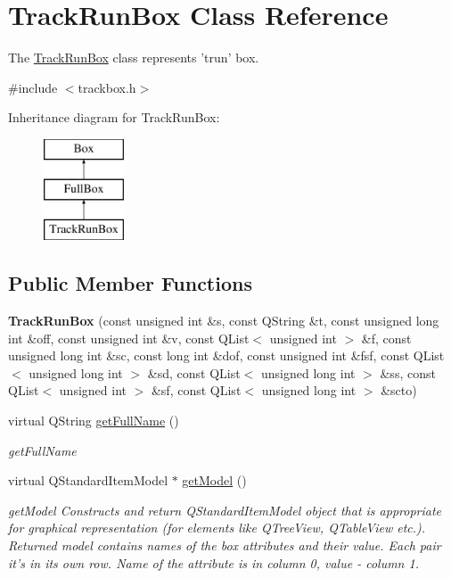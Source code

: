 \hypertarget{class_track_run_box}{\section{Track\-Run\-Box Class Reference}
\label{class_track_run_box}
}


The \hyperlink{class_track_run_box}{Track\-Run\-Box} class represents 'trun' box.  




{\ttfamily \#include $<$trackbox.\-h$>$}

Inheritance diagram for Track\-Run\-Box\-:\begin{figure}[H]
\begin{center}
\leavevmode
\includegraphics[height=3.000000cm]{class_track_run_box}
\end{center}
\end{figure}
\subsection*{Public Member Functions}
\begin{DoxyCompactItemize}
\item 
\hypertarget{class_track_run_box_a8d6ff78f87ff74803614479a5c414869}{{\bfseries Track\-Run\-Box} (const unsigned int \&s, const Q\-String \&t, const unsigned long int \&off, const unsigned int \&v, const Q\-List$<$ unsigned int $>$ \&f, const unsigned long int \&sc, const long int \&dof, const unsigned int \&fsf, const Q\-List$<$ unsigned long int $>$ \&sd, const Q\-List$<$ unsigned long int $>$ \&ss, const Q\-List$<$ unsigned int $>$ \&sf, const Q\-List$<$ unsigned long int $>$ \&scto)}\label{class_track_run_box_a8d6ff78f87ff74803614479a5c414869}

\item 
virtual Q\-String \hyperlink{class_track_run_box_a26fb4feae53dac2aa48caaa39ccceb81}{get\-Full\-Name} ()
\begin{DoxyCompactList}\small\item\em get\-Full\-Name \end{DoxyCompactList}\item 
virtual Q\-Standard\-Item\-Model $\ast$ \hyperlink{class_track_run_box_ab2cc42d77e882ea0be127059ebda2c4d}{get\-Model} ()
\begin{DoxyCompactList}\small\item\em get\-Model Constructs and return Q\-Standard\-Item\-Model object that is appropriate for graphical representation (for elements like Q\-Tree\-View, Q\-Table\-View etc.). Returned model contains names of the box attributes and their value. Each pair it's in its own row. Name of the attribute is in column 0, value -\/ column 1. \end{DoxyCompactList}\end{DoxyCompactItemize}
